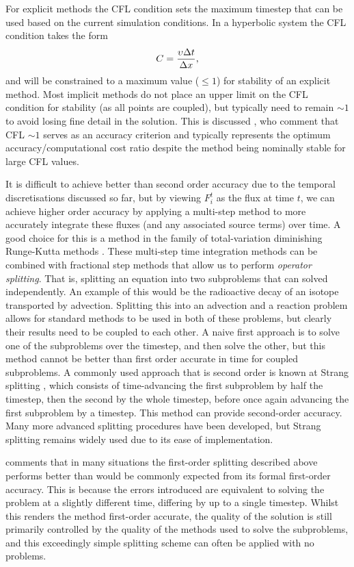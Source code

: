 For explicit methods the CFL condition sets the maximum timestep that can be used based on the current simulation conditions.
In a hyperbolic system the CFL condition takes the form
\begin{equation}
    C = \frac{\upsilon\Delta t}{\Delta x},
\end{equation}
and will be constrained to a maximum value ($\leq 1$) for stability of an explicit method.
Most implicit methods do not place an upper limit on the CFL condition for stability (as all points are coupled), but typically need to remain $\sim 1$ to avoid losing fine detail in the solution.
This is discussed \citet{Viallet2011}, who comment that CFL $\sim 1$ serves as an accuracy criterion and typically represents the optimum accuracy/computational cost ratio despite the method being nominally stable for large CFL values.

It is difficult to achieve better than second order accuracy due to the temporal discretisations discussed so far, but by viewing $F_i^t$ as the flux at time $t$, we can achieve higher order accuracy by applying a multi-step method to more accurately integrate these fluxes (and any associated source terms) over time.
A good choice for this is a method in the family of total-variation diminishing Runge-Kutta methods \citep[e.g.][]{Shu1988}.
These multi-step time integration methods can be combined with fractional step methods that allow us to perform \emph{operator splitting}.
That is, splitting an equation into two subproblems that can solved independently.
An example of this would be the radioactive decay of an isotope transported by advection.
Splitting this into an advection and a reaction problem allows for standard methods to be used in both of these problems, but clearly their results need to be coupled to each other.
A naive first approach is to solve one of the subproblems over the timestep, and then solve the other, but this method cannot be better than first order accurate in time for coupled subproblems.
A commonly used approach that is second order is known at Strang splitting \citep{Strang1968}, which consists of time-advancing the first subproblem by half the timestep, then the second by the whole timestep, before once again advancing the first subproblem by a timestep.
This method can provide second-order accuracy.
Many more advanced splitting procedures have been developed, but Strang splitting remains widely used due to its ease of implementation.

\citet{LeVeque1997} comments that in many situations the first-order splitting described above performs better than would be commonly expected from its formal first-order accuracy.
This is because the errors introduced are equivalent to solving the problem at a slightly different time, differing by up to a single timestep.
Whilst this renders the method first-order accurate, the quality of the solution is still primarily controlled by the quality of the methods used to solve the subproblems, and this exceedingly simple splitting scheme can often be applied with no problems.

